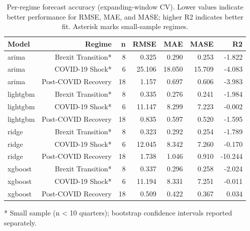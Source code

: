 \begin{table}
\caption{Per-regime forecast accuracy (expanding-window CV). Lower values indicate better performance for RMSE, MAE, and MASE; higher R2 indicates better fit. Asterisk marks small-sample regimes.}
\begin{tabular}{lrrrrrr}
\toprule
Model & Regime & n & RMSE & MAE & MASE & R2 \\
\midrule
arima & Brexit Transition* & 8 & 0.325 & 0.290 & 0.253 & -1.822 \\
arima & COVID-19 Shock* & 6 & 25.106 & 18.050 & 15.709 & -4.083 \\
arima & Post-COVID Recovery & 18 & 1.157 & 0.697 & 0.606 & -3.983 \\
lightgbm & Brexit Transition* & 8 & 0.335 & 0.276 & 0.241 & -1.984 \\
lightgbm & COVID-19 Shock* & 6 & 11.147 & 8.299 & 7.223 & -0.002 \\
lightgbm & Post-COVID Recovery & 18 & 0.835 & 0.597 & 0.520 & -1.595 \\
ridge & Brexit Transition* & 8 & 0.323 & 0.292 & 0.254 & -1.789 \\
ridge & COVID-19 Shock* & 6 & 12.045 & 8.342 & 7.260 & -0.170 \\
ridge & Post-COVID Recovery & 18 & 1.738 & 1.046 & 0.910 & -10.244 \\
xgboost & Brexit Transition* & 8 & 0.337 & 0.296 & 0.258 & -2.024 \\
xgboost & COVID-19 Shock* & 6 & 11.194 & 8.331 & 7.251 & -0.011 \\
xgboost & Post-COVID Recovery & 18 & 0.509 & 0.422 & 0.367 & 0.034 \\
\bottomrule
\end{tabular}
\end{table}

* Small sample (n < 10 quarters); bootstrap confidence intervals reported separately.